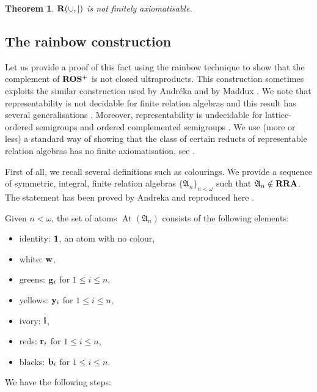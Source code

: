 \documentclass[a4paper]{article}
\theoremstyle{defin}
\theoremstyle{theorem}
\newtheorem{theorem}{Theorem}
\theoremstyle{prop}
\theoremstyle{lemma}
\theoremstyle{ex}
\theoremstyle{col}
\theoremstyle{claim}
\begin{document}
\begin{theorem}
  ${\bf R}(\cup, |)$ is not finitely axiomatisable.
\end{theorem}

\subsection{The rainbow construction}

Let us provide a proof of this fact using the rainbow technique \cite{hirsch2002relation} to show that the complement of ${\bf ROS^{+}}$ is not closed ultraproducts. This construction sometimes exploits the similar construction used by Andr{\'e}ka \cite{andreka1991representations} and by Maddux \cite{maddux_1989}.
We note that representability is not decidable for finite relation algebras \cite{hirsch2001representability} and this result has several generalisations \cite{hirsch2012undecidability}. Moreover, representability is undecidable for lattice-ordered semigroups and ordered complemented semigroups \cite{neuzerling2016undecidability}. We use (more or less) a standard way of showing that the class of certain reducts of representable relation algebras has no finite axiomatisation, see \cite{hodkinson2000axiomatizability} \cite{hirsch1997step}.

First of all, we recall several definitions such as colourings. We provide a sequence of symmetric, integral, finite relation algebras $\{ \mathfrak{A}_n \}_{n < \omega}$ such that $\mathfrak{A}_n \notin {\bf RRA}$. The statement has been proved by Andreka \cite{andreka1991representations} and reproduced here \cite{andreka2011axiomatizability}.

Given $n < \omega$, the set of atoms $\operatorname{At}(\mathfrak{A}_n)$ consists of the following elements:
\begin{itemize}
\item identity: ${\bf 1}$, an atom with no colour,
\item white: ${\bf w}$,
\item greens: ${\bf g}_i$ for $1 \leq i \leq n$,
\item yellows: ${\bf y}_i$ for $1 \leq i \leq n$,
\item ivory: ${\bf i}$,
\item reds: ${\bf r}_i$ for $1 \leq i \leq n$,
\item blacks: ${\bf b}_i$ for $1 \leq i \leq n$.
\end{itemize}

We have the following steps:
\end{document}

